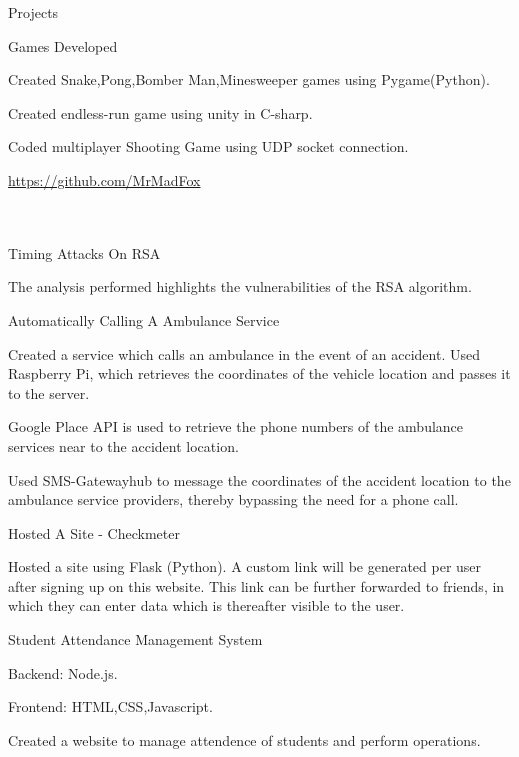 \documentclass{resume} %
\begin{document}
\begin{rSection}{Projects}

\begin{rSubsection}{ Games Developed}{}{}

\item Created Snake,Pong,Bomber Man,Minesweeper games using Pygame(Python).
\item Created endless-run game using unity in C-sharp.
\item Coded multiplayer Shooting Game using UDP socket connection.
\item  \url{https://github.com/MrMadFox}
\\
\\
\\

\end{rSubsection}

\begin{rSubsection}{ Timing Attacks On RSA}{}{}

\item The analysis performed highlights the vulnerabilities of the RSA algorithm.

\end{rSubsection}


\begin{rSubsection}{ Automatically Calling A Ambulance Service}{}{}

\item Created a service which calls an ambulance in the event of an accident. Used Raspberry Pi, which retrieves the coordinates of the vehicle location and passes it to the server.
\item Google Place API is used to retrieve the phone numbers of the ambulance services near to the accident location.
\item Used SMS-Gatewayhub to message the coordinates of the accident location to the ambulance service providers, thereby bypassing the need for a phone call.

\end{rSubsection}


\begin{rSubsection}{ Hosted A Site - Checkmeter}{}{}

\item Hosted a site using Flask (Python). A custom link will be generated per user after signing up on this website. This link can be further forwarded to friends, in which they can enter data which is thereafter visible to the user.

\end{rSubsection}

\begin{rSubsection}{ Student Attendance Management System}{}{}

    \item Backend: Node.js.
    \item Frontend: HTML,CSS,Javascript.
    \item Created a website to manage attendence of students and perform operations.

\end{rSubsection}

\end{rSection}
\end{document}
